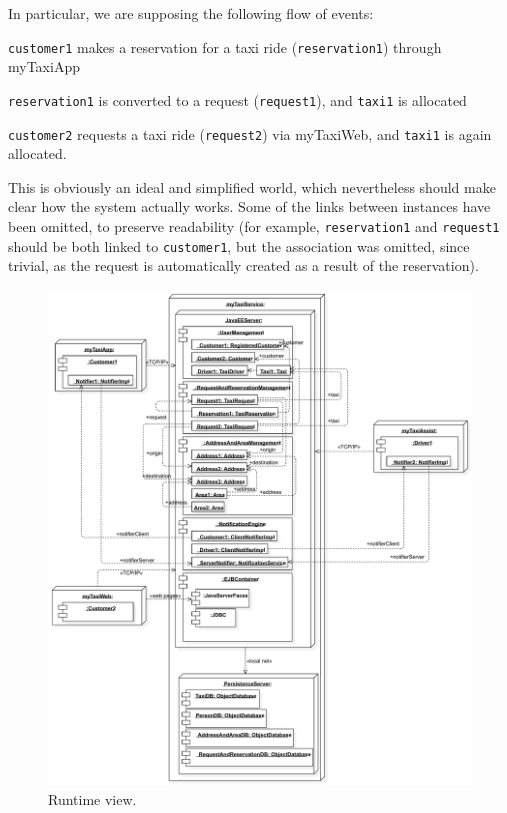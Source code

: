 In particular, we are supposing the following flow of events: \begin{enumerate*}[itemjoin={{; }}, label={{(\arabic*)}}]
	
	\item \texttt{cus\-tom\-er1} makes a reservation for a taxi ride (\texttt{reservation1}) through myTaxiApp
	
	\item \texttt{res\-er\-va\-tion1} is converted to a request (\texttt{re\-quest1}), and \texttt{taxi1} is allocated
	
	\item \texttt{cus\-tom\-er2} requests a taxi ride (\texttt{re\-quest2}) via myTaxiWeb, and \texttt{taxi1} is again allocated\footnotemark.
	
\end{enumerate*}

This is obviously an ideal and simplified world, which nevertheless should make clear how the system actually works. Some of the links between instances have been omitted, to preserve readability (for example, \texttt{res\-er\-va\-tion1} and \texttt{re\-quest1} should be both linked to \texttt{cus\-tom\-er1}, but the association was omitted, since trivial, as the request is automatically created as a result of the reservation).

\begin{figure}%
	\centering%
	\includegraphics[width=\linewidth]{img/Runtime__RuntimeView_5}%
	\caption{Runtime view.}\label{fig:runtime}%
\end{figure}




